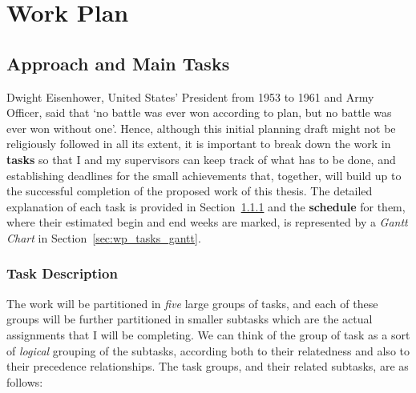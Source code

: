 \chapter{Work Plan}\label{chap:workPlan}

\section{Approach and  Main Tasks}
Dwight Eisenhower, United States' President from 1953 to 1961 and Army Officer, said that `no battle was ever won according to plan, but no battle was ever won without one'. Hence, although this initial planning draft might not be religiously followed in all its extent, it is important to break down the work in \textbf{tasks} so that I and my supervisors can keep track of what has to be done, and establishing deadlines for the small achievements that, together, will build up to the successful completion of the proposed work of this thesis. The detailed explanation of each task is provided in Section~\ref{sec:wp_tasks_td} and the \textbf{schedule} for them, where their estimated begin and end weeks are marked, is represented by a \emph{Gantt Chart} in Section~\ref{sec:wp_tasks_gantt}.

\subsection{Task Description}\label{sec:wp_tasks_td}
The work will be partitioned in \emph{five} large groups of tasks, and each of these groups will be further partitioned in smaller subtasks which are the actual assignments that I will be completing. We can think of the group of task as a sort of \emph{logical} grouping of the subtasks, according both to their relatedness and also to their precedence relationships. The task groups, and their related subtasks, are as follows:

